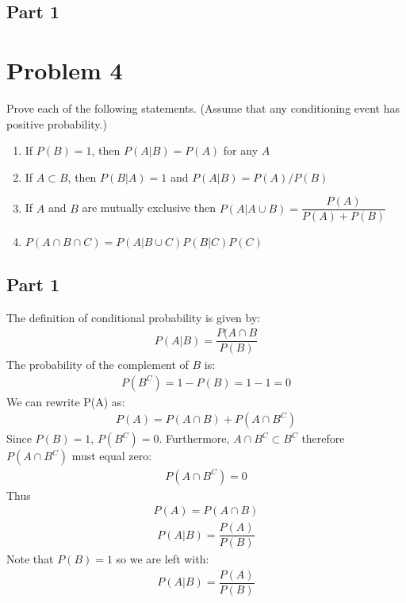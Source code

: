\documentclass{article}
\begin{document}
\subsection*{Part 1}
\clearpage
\section*{Problem 4}
Prove each of the following statements. (Assume that any conditioning event has positive probability.)
\begin{enumerate}
\item
If $P(B) = 1$, then $P(A|B) = P(A)$ for any $A$
\item
If $A \subset B$, then $P(B|A) = 1$ and $P(A|B)=P(A)/P(B)$
\item
If $A$ and $B$ are mutually exclusive then $P(A|A\cup B) = \dfrac{P(A)}{P(A)+P(B)}$
\item
$P(A\cap B \cap C) = P(A|B\cup C) P(B|C) P(C)$
\end{enumerate}
\subsection*{Part 1}
The definition of conditional probability is given by:
\begin{align*}
P(A|B) = \dfrac{P(A\cap B}{P(B)}
\end{align*}
The probability of the complement of $B$ is:
\begin{align*}
P(B^C) = 1-P(B) = 1-1 = 0
\end{align*}
We can rewrite P(A) as:
\begin{align*}
P(A) = P(A\cap B) + P(A\cap B^C)
\end{align*}
Since $P(B) = 1$, $P(B^C)=0$. Furthermore, $A\cap B^C\subset B^C$ therefore $P(A\cap B^C)$ must equal zero:
\begin{align*}
P(A\cap B^C) = 0
\end{align*}
Thus
\begin{align*}
P(A) = P(A\cap B)
\end{align*}
\begin{align*}
P(A|B) = \dfrac{P(A)}{P(B)}
\end{align*}
Note that $P(B)=1$ so we are left with:
\begin{align*}
\boxed{P(A|B) = \dfrac{P(A)}{P(B)}}
\end{align*}
\end{document}
